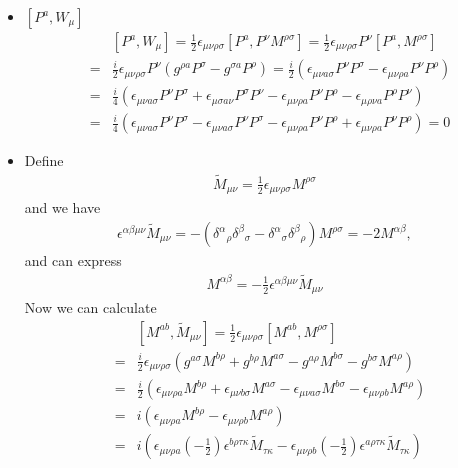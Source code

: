 \documentclass[11pt]{article}
\begin{document}
\begin{itemize}
  \item $[P^a,W_\mu]$
  \begin{eqnarray}
    &&[P^a,W_\mu]=\frac{1}{2} \epsilon_{\mu\nu\rho\sigma} [P^a, P^\nu M^{\rho\sigma}]= \frac{1}{2} \epsilon_{\mu\nu\rho\sigma} P^\nu [P^a, M^{\rho\sigma}] \\
    &=&\frac{i}{2} \epsilon_{\mu\nu\rho\sigma} P^\nu(g^{\rho a}P^\sigma -g^{\sigma a} P^\rho ) = \frac{i}{2} (\epsilon_{\mu\nu a \sigma} P^\nu P^\sigma - \epsilon_{\mu\nu \rho a} P^\nu P^\rho) \\
    &=& \frac{i}{4} (\epsilon_{\mu\nu a \sigma} P^\nu P^\sigma + \epsilon_{\mu\sigma a \nu}  P^\sigma P^\nu - \epsilon_{\mu\nu \rho a} P^\nu P^\rho- \epsilon_{\mu \rho \nu a}  P^\rho P^\nu) \\
    &=&\frac{i}{4} (\epsilon_{\mu\nu a \sigma} P^\nu P^\sigma - \epsilon_{\mu\nu a \sigma} P^\nu P^\sigma - \epsilon_{\mu\nu \rho a} P^\nu P^\rho+\epsilon_{\mu\nu \rho a} P^\nu P^\rho)=0
  \end{eqnarray}
  \item 
  Define 
  \begin{eqnarray}
    {\tilde M}_{\mu \nu} =\frac{1}{2}\epsilon_{\mu\nu\rho\sigma} M^{\rho \sigma}
  \end{eqnarray}
and we have 
\begin{eqnarray}
  \epsilon^{\alpha\beta\mu\nu} {\tilde M}_{\mu \nu}=-({\delta^\alpha}_\rho{\delta^\beta}_\sigma-{\delta^\alpha}_\sigma{\delta^\beta}_\rho)M^{\rho \sigma}=-2M^{\alpha \beta},
\end{eqnarray}
and can express
\begin{eqnarray}
  M^{\alpha \beta}=-\frac{1}{2}\epsilon^{\alpha\beta\mu\nu} {\tilde M}_{\mu \nu}
\end{eqnarray}
Now we can calculate
\begin{eqnarray}
  &&[M^{ab},{\tilde M}_{\mu \nu}]=\frac{1}{2}\epsilon_{\mu\nu\rho\sigma}[M^{ab},M^{\rho \sigma}]\\
  &=&\frac{i}{2}\epsilon_{\mu\nu\rho\sigma} (g^{a\sigma}M^{b\rho}+g^{b\rho}M^{a\sigma}-g^{a\rho}M^{b\sigma}-g^{b\sigma}M^{a\rho}) \\
  &=&\frac{i}{2} (\epsilon_{\mu\nu\rho a} M^{b\rho}+\epsilon_{\mu\nu b \sigma}M^{a\sigma}-\epsilon_{\mu\nu a \sigma}M^{b\sigma}-\epsilon_{\mu\nu\rho b }M^{a\rho}) \\
  &=&i(\epsilon_{\mu\nu\rho a} M^{b\rho}-\epsilon_{\mu\nu\rho b }M^{a\rho}) \\
  &=& i(\epsilon_{\mu\nu\rho a} (-\frac{1}{2}) \epsilon^{b \rho \tau \kappa} {\tilde M}_{\tau \kappa}-\epsilon_{\mu\nu\rho b }(-\frac{1}{2}) \epsilon^{a \rho \tau \kappa} {\tilde M}_{\tau \kappa}) \\

\end{eqnarray}
\end{itemize}
\end{document}
